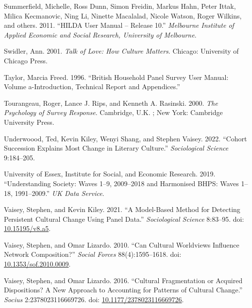 \documentclass[
  11pt,
]{article}
\newlength{\cslhangindent}
\newlength{\cslentryspacingunit} %
\newenvironment{CSLReferences}[2] %
 {%
  \setlength{\parindent}{0pt}
  \ifodd #1
  \let\oldpar\par
  \def\par{\hangindent=\cslhangindent\oldpar}
  \fi
  \setlength{\parskip}{#2\cslentryspacingunit}
 }%
 {}
\begin{document}
\begin{CSLReferences}{1}{0}
\leavevmode{}%
Summerfield, Michelle, Ross Dunn, Simon Freidin, Markus Hahn, Peter
Ittak, Milica Kecmanovic, Ning Li, Ninette Macalalad, Nicole Watson,
Roger Wilkins, and others. 2011. {``HILDA User Manual -- Release 10.''}
\emph{Melbourne Institute of Applied Economic and Social Research,
University of Melbourne}.

\leavevmode{}%
Swidler, Ann. 2001. \emph{Talk of {Love}: {How} {Culture} {Matters}}.
Chicago: University of Chicago Press.

\leavevmode{}%
Taylor, Marcia Freed. 1996. {``British Household Panel Survey User
Manual: Volume a-Introduction, Technical Report and Appendices.''}

\leavevmode{}%
Tourangeau, Roger, Lance J. Rips, and Kenneth A. Rasinski. 2000.
\emph{The Psychology of Survey Response}. Cambridge, U.K. ; New York:
Cambridge University Press.

\leavevmode{}%
Underwoood, Ted, Kevin Kiley, Wenyi Shang, and Stephen Vaisey. 2022.
{``Cohort Succession Explains Most Change in Literary Culture.''}
\emph{Sociological Science} 9:184--205.

\leavevmode{}%
University of Essex, Institute for Social, and Economic Research. 2019.
{``Understanding Society: Waves 1--9, 2009--2018 and Harmonised BHPS:
Waves 1--18, 1991--2009.''} \emph{UK Data Service}.

\leavevmode{}%
Vaisey, Stephen, and Kevin Kiley. 2021. {``A {Model}-{Based} {Method}
for {Detecting} {Persistent} {Cultural} {Change} {Using} {Panel}
{Data}.''} \emph{Sociological Science} 8:83--95. doi:
\href{https://doi.org/10.15195/v8.a5}{10.15195/v8.a5}.

\leavevmode{}%
Vaisey, Stephen, and Omar Lizardo. 2010. {``Can {Cultural} {Worldviews}
{Influence} {Network} {Composition}?''} \emph{Social Forces}
88(4):1595--1618. doi:
\href{https://doi.org/10.1353/sof.2010.0009}{10.1353/sof.2010.0009}.

\leavevmode{}%
Vaisey, Stephen, and Omar Lizardo. 2016. {``Cultural {Fragmentation} or
{Acquired} {Dispositions}? {A} {New} {Approach} to {Accounting} for
{Patterns} of {Cultural} {Change}.''} \emph{Socius} 2:2378023116669726.
doi:
\href{https://doi.org/10.1177/2378023116669726}{10.1177/2378023116669726}.


\end{CSLReferences}
\end{document}
